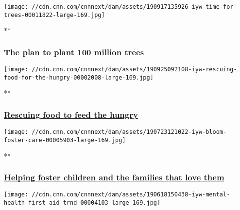 \texttt{[image: //cdn.cnn.com/cnnnext/dam/assets/190917135926-iyw-time-for-trees-00011822-large-169.jpg]}

**

\hypertarget{the-plan-to-plant-100-million-trees}{%
\subsubsection{\texorpdfstring{\href{/videos/tv/2019/09/17/iyw-time-for-trees.cnn/video/playlists/impact-your-world/}{The
plan to plant 100 million
trees}}{The plan to plant 100 million trees}}\label{the-plan-to-plant-100-million-trees}}

\href{/videos/tv/2019/09/24/iyw-rescuing-food-for-the-hungry.cnn/video/playlists/impact-your-world/}{}

\texttt{[image: //cdn.cnn.com/cnnnext/dam/assets/190925092108-iyw-rescuing-food-for-the-hungry-00002008-large-169.jpg]}

**

\hypertarget{rescuing-food-to-feed-the-hungry}{%
\subsubsection{\texorpdfstring{\href{/videos/tv/2019/09/24/iyw-rescuing-food-for-the-hungry.cnn/video/playlists/impact-your-world/}{Rescuing
food to feed the
hungry}}{Rescuing food to feed the hungry}}\label{rescuing-food-to-feed-the-hungry}}

\href{/videos/tv/2019/07/20/iyw-bloom-foster-care.cnn/video/playlists/impact-your-world/}{}

\texttt{[image: //cdn.cnn.com/cnnnext/dam/assets/190723121022-iyw-bloom-foster-care-00005903-large-169.jpg]}

**

\hypertarget{helping-foster-children-and-the-families-that-love-them}{%
\subsubsection{\texorpdfstring{\href{/videos/tv/2019/07/20/iyw-bloom-foster-care.cnn/video/playlists/impact-your-world/}{Helping
foster children and the families that love
them}}{Helping foster children and the families that love them}}\label{helping-foster-children-and-the-families-that-love-them}}

\href{/videos/health/2019/06/18/iyw-mental-health-first-aid-trnd.cnn/video/playlists/impact-your-world/}{}

\texttt{[image: //cdn.cnn.com/cnnnext/dam/assets/190618150438-iyw-mental-health-first-aid-trnd-00004103-large-169.jpg]}

